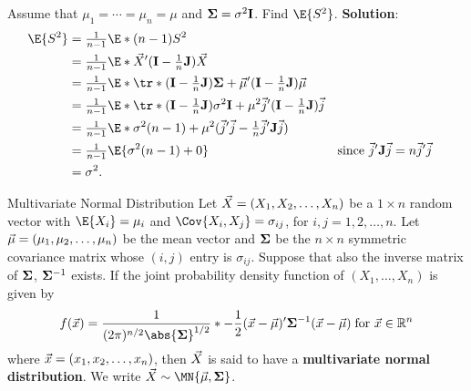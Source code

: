 \begin{Example}{}{}
    Assume that $ \mu_1=\cdots=\mu_n=\mu $ and $ \mathbf{\Sigma}=\sigma^2 \mathbf{I} $. Find $ \E{S^2} $.
    \tcblower{}
    \textbf{Solution}:
    \begin{align*}
        \E{S^2}
         & =\tfrac{1}{n-1}\E*{(n-1)S^2}                                                                                                                                                                                                 \\
         & =\tfrac{1}{n-1}\E*{\Vector{X}'(\Matrix{I}-\tfrac{1}{n}\Matrix{J})\Vector{X}}                                                                                                                                                 \\
         & =\tfrac{1}{n-1}\E*{\tr*{(\Matrix{I}-\tfrac{1}{n}\Matrix{J})\Matrix{\Sigma}}+\Vector{\mu}'(\Matrix{I}-\tfrac{1}{n}\Matrix{J})\Vector{\mu}}                                                                                    \\
         & =\tfrac{1}{n-1}\E*{\tr*{(\Matrix{I}-\tfrac{1}{n}\Matrix{J})\sigma^2\Matrix{I}}+\mu^2 \Vector{j}'(\Matrix{I}-\tfrac{1}{n}\Matrix{J})\Vector{j}}                                                                               \\
         & =\tfrac{1}{n-1}\E*{\sigma^2(n-1)+\mu^2(\Vector{j}'\Vector{j}-\tfrac{1}{n}\Vector{j}'\Matrix{J}\Vector{j})}                                                                                                                   \\
         & =\tfrac{1}{n-1}\E{\sigma^2(n-1)+0}                                                                                                             &  & \text{since $ \Vector{j}'\Matrix{J}\Vector{j}=n \Vector{j}'\Vector{j} $} \\
         & =\sigma^2.
    \end{align*}
\end{Example}
\begin{Remark}{Multivariate Normal Distribution}{}
    Let $ \vec{X}=(X_1,X_2,\ldots,X_n) $
    be a $ 1\times n $ random vector with $ \E{X_i}=\mu_i $
    and $ \Cov{X_i,X_j}=\sigma_{ij} $, for $ i,j=1,2,\ldots,n $.
    Let $ \vec{\mu}=(\mu_1,\mu_2,\ldots,\mu_n) $
    be the mean vector and $ \mathbf{\Sigma} $ be the $ n\times n $
    symmetric covariance matrix
    whose $ (i,j) $ entry is $ \sigma_{ij} $. Suppose that also
    the inverse matrix of $ \mathbf{\Sigma} $, $ \mathbf{\Sigma}^{-1} $ exists.
    If the joint probability density function of $ (X_1,\ldots,X_n) $ is given by
    \[ f(\Vector{x})=\frac{1}{(2\pi)^{n/2}\abs{\Matrix{\Sigma}}^{1/2}}
        \exp*{-\frac{1}{2}(\Vector{x}-\Vector{\mu})'\Matrix{\Sigma}^{-1}(\Vector{x}-\Vector{\mu})}\;
        \text{for $ \Vector{x}\in\R^{n} $} \]
    where $ \vec{x}=(x_1,x_2,\ldots,x_n) $, then $ \vec{X} $
    is said to have a \textbf{multivariate normal distribution}. We write
    $ \Vector{X}\sim \MN{\Vector{\mu},\Matrix{\Sigma}} $.
\end{Remark}
